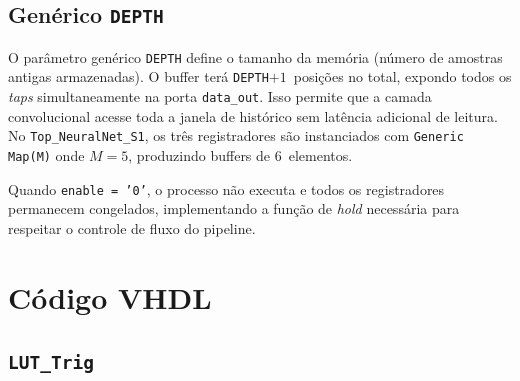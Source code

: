 \documentclass[a4paper,12pt]{article}
\begin{document}
\subsection{Gen\'erico \texttt{DEPTH}}

O par\^ametro gen\'erico \texttt{DEPTH} define o tamanho da mem\'oria (n\'umero de amostras
antigas armazenadas). O buffer ter\'a \texttt{DEPTH}$+1$~posi\c{c}\~oes no total, expondo
todos os \textit{taps} simultaneamente na porta \texttt{data\_out}. Isso permite que a camada
convolucional acesse toda a janela de hist\'orico sem lat\^encia adicional de leitura. No
\texttt{Top\_NeuralNet\_S1}, os tr\^es registradores s\~ao instanciados com
\texttt{Generic Map(M)} onde $M = 5$, produzindo buffers de 6~elementos.

Quando \texttt{enable = '0'}, o processo n\~ao executa e todos os registradores permanecem
congelados, implementando a fun\c{c}\~ao de \textit{hold} necess\'aria para respeitar o controle
de fluxo do pipeline.


\section{C\'odigo VHDL}

\subsection{\texttt{LUT\_Trig}}
\end{document}
